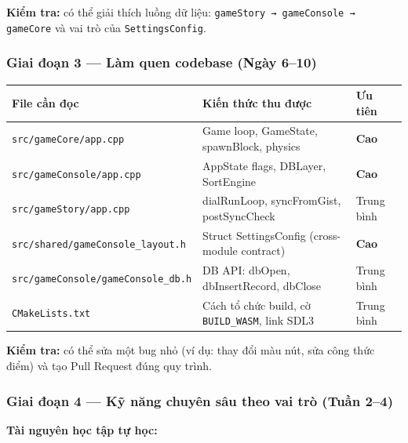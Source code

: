 \documentclass[12pt,a4paper]{article}
\begin{document}
\textbf{Kiểm tra:} có thể giải thích luồng dữ liệu: \texttt{gameStory → gameConsole → gameCore}
và vai trò của \texttt{SettingsConfig}.

\subsubsection{Giai đoạn 3 --- Làm quen codebase (Ngày 6--10)}

\begin{tabularx}{\linewidth}{|l|X|l|}
\hline
\rowcolor{gray!20}
\textbf{File cần đọc} & \textbf{Kiến thức thu được} & \textbf{Ưu tiên} \\
\hline
\texttt{src/gameCore/app.cpp} & Game loop, GameState, spawnBlock, physics & \textbf{Cao} \\
\hline
\texttt{src/gameConsole/app.cpp} & AppState flags, DBLayer, SortEngine & \textbf{Cao} \\
\hline
\texttt{src/gameStory/app.cpp} & dialRunLoop, syncFromGist, postSyncCheck & Trung bình \\
\hline
\texttt{src/shared/gameConsole\_layout.h} & Struct SettingsConfig (cross-module contract) & \textbf{Cao} \\
\hline
\texttt{src/gameConsole/gameConsole\_db.h} & DB API: dbOpen, dbInsertRecord, dbClose & Trung bình \\
\hline
\texttt{CMakeLists.txt} & Cách tổ chức build, cờ \texttt{BUILD\_WASM}, link SDL3 & Trung bình \\
\hline
\end{tabularx}

\vspace{4pt}
\textbf{Kiểm tra:} có thể sửa một bug nhỏ (ví dụ: thay đổi màu nút, sửa công thức điểm) và
tạo Pull Request đúng quy trình.

\subsubsection{Giai đoạn 4 --- Kỹ năng chuyên sâu theo vai trò (Tuần 2--4)}

\noindent\textbf{Tài nguyên học tập tự học:}
\end{document}
